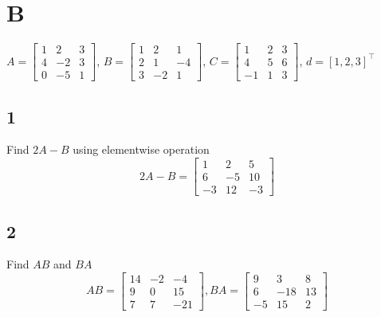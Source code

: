 \documentclass{article}
\begin{document}
\section*{B}

\(
    A = \begin{bmatrix}
        1 & 2 & 3\\
        4 & -2 & 3\\
        0 & -5 & 1
    \end{bmatrix}
\), \(B=\begin{bmatrix}
    1 & 2 & 1\\
    2 & 1 & -4\\
    3 & -2 & 1
\end{bmatrix}\), \(C = \begin{bmatrix}
    1 & 2 & 3\\
    4 & 5 & 6\\
    -1 & 1 & 3
\end{bmatrix}\), \(d = [1,2,3]^\top\)

\subsection*{1}
\begin{myleftlinebox}
    Find \(2A-B\)
    \tcblower
    using elementwise operation
    \[
        2A-B = \begin{bmatrix}
            1 & 2 & 5\\
            6 & -5 & 10\\
            -3 & 12 & -3
        \end{bmatrix}
    \]
\end{myleftlinebox}


\subsection*{2}
\begin{myleftlinebox}
    Find \(AB\) and \(BA\)
    \tcblower
    \[
        AB = \begin{bmatrix}
            14 & -2 & -4\\
            9 & 0 & 15\\
            7 & 7 & -21
        \end{bmatrix}, BA =  \begin{bmatrix}
            9 & 3 & 8\\
            6 & -18 & 13\\
            -5 & 15 & 2
        \end{bmatrix}
    \]
\end{myleftlinebox}
\end{document}
